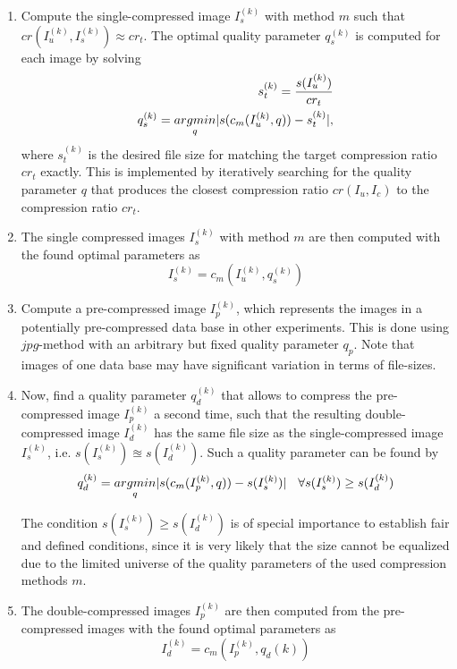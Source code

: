 \documentclass[10pt,twocolumn,letterpaper]{article}
\begin{document}
\begin{enumerate}
	\item Compute the single-compressed image $I_s^{(k)}$ with method $m$ such that $cr(I_u^{(k)}, I_s^{(k)}) \approx cr_t$. The optimal quality parameter $q_s^{(k)}$ is computed for each image by solving
	\begin{eqnarray}
	\small
	s_t^{(k)} = \frac{s(I_u^{(k)})}{cr_t} \\
		q_s^{(k)} = \underset{q}{argmin}|s(c_m(I_u^{(k)},q)) - s_t^{(k)}|,
	\end{eqnarray} where $s_t^{(k)}$ is the desired file size for matching the target compression ratio $cr_t$ exactly. This is implemented by iteratively searching for the quality parameter $q$ that produces the closest compression ratio $cr(I_u, I_c)$ to the compression ratio $cr_t$. 
	\item The single compressed images $I_s^{(k)}$ with method $m$ are then computed with the found optimal parameters as
	\begin{equation}
	I_s^{(k)} = c_m(I_u^{(k)}, q_s^{(k)})
	\end{equation}
	
	\item Compute a pre-compressed image $I_p^{(k)}$, which represents the images in a potentially pre-compressed data base in other experiments. This is done using $jpg$-method \cite{jpg} with an arbitrary but fixed quality parameter $q_p$. Note that images of one data base may have significant variation in terms of file-sizes.
	
	\item Now, find a quality parameter $q_d^{(k)}$ that allows to compress the pre-compressed image $I_p^{(k)}$ a second time, such that the resulting double-compressed image $I_d^{(k)}$ has the same file size as the single-compressed image $I_s^{(k)}$, i.e. $s(I_s^{(k)}) \approxeq s(I_d^{(k)})$. Such a quality parameter can be found by 
	\begin{equation}
	\small
		q_d^{(k)} = \underset{q}{argmin}|s(c_m(I_p^{(k)},q)) - s(I_s^{(k)})| \quad \forall s(I_s^{(k)}) \geq s(I_d^{(k)})
	\end{equation}
	
	The condition $s(I_s^{(k)}) \geq s(I_d^{(k)})$ is of special importance to establish fair and defined conditions, since it is very likely that the size cannot be equalized due to the limited universe of the quality parameters of the used compression methods $m$.
	
	\item The double-compressed images $I_p^{(k)}$ are then computed from the pre-compressed images with the found optimal parameters as
	\begin{equation}
		I_d^{(k)} = c_m(I_p^{(k)}, q_d{(k)})
	\end{equation}
	
\end{enumerate}
\end{document}
